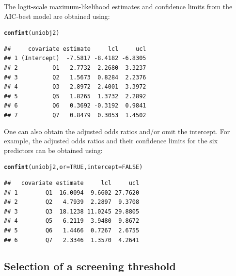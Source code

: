 \documentclass[11pt]{report}\usepackage[]{graphicx}\usepackage[]{xcolor}
\makeatletter
\newcommand{\hlnum}[1]{\textcolor[rgb]{0.686,0.059,0.569}{#1}}%
\newcommand{\hlstd}[1]{\textcolor[rgb]{0.345,0.345,0.345}{#1}}%
\newcommand{\hlkwc}[1]{\textcolor[rgb]{0.333,0.667,0.333}{#1}}%
\newcommand{\hlkwd}[1]{\textcolor[rgb]{0.737,0.353,0.396}{\textbf{#1}}}%
\newenvironment{kframe}{%
 \def\at@end@of@kframe{}%
 \ifinner\ifhmode%
  \def\at@end@of@kframe{\end{minipage}}%
  \begin{minipage}{\columnwidth}%
 \fi\fi%
 \def\FrameCommand##1{\hskip\@totalleftmargin \hskip-\fboxsep
 \colorbox{shadecolor}{##1}\hskip-\fboxsep
     \hskip-\linewidth \hskip-\@totalleftmargin \hskip\columnwidth}%
 \MakeFramed {\advance\hsize-\width
   \@totalleftmargin\z@ \linewidth\hsize
   \@setminipage}}%
 {\par\unskip\endMakeFramed%
 \at@end@of@kframe}
\newenvironment{knitrout}{}{} %
\makeatother
\begin{document}
The logit-scale maximum-likelihood estimates and confidence limits
from the AIC-best model are obtained using:
\begin{knitrout}
\color{fgcolor}\begin{kframe}
\begin{alltt}
\hlkwd{confint}\hlstd{(uniobj2)}
\end{alltt}


{\ttfamily\noindent\itshape\color{messagecolor}{\#\# Waiting for profiling to be done...}}\begin{verbatim}
##     covariate estimate     lcl     ucl
## 1 (Intercept)  -7.5817 -8.4182 -6.8305
## 2          Q1   2.7732  2.2680  3.3237
## 3          Q2   1.5673  0.8284  2.2376
## 4          Q3   2.8972  2.4001  3.3972
## 5          Q5   1.8265  1.3732  2.2892
## 6          Q6   0.3692 -0.3192  0.9841
## 7          Q7   0.8479  0.3053  1.4502
\end{verbatim}
\end{kframe}
\end{knitrout}
One can also obtain the adjusted odds ratios and/or omit the
intercept.  For example, the adjusted odds ratios and their confidence
limits for the six
predictors can be obtained using:
\begin{knitrout}
\color{fgcolor}\begin{kframe}
\begin{alltt}
\hlkwd{confint}\hlstd{(uniobj2,} \hlkwc{or} \hlstd{=} \hlnum{TRUE}\hlstd{,} \hlkwc{intercept} \hlstd{=} \hlnum{FALSE}\hlstd{)}
\end{alltt}


{\ttfamily\noindent\itshape\color{messagecolor}{\#\# Waiting for profiling to be done...}}\begin{verbatim}
##   covariate estimate     lcl     ucl
## 1        Q1  16.0094  9.6602 27.7620
## 2        Q2   4.7939  2.2897  9.3708
## 3        Q3  18.1238 11.0245 29.8805
## 4        Q5   6.2119  3.9480  9.8672
## 5        Q6   1.4466  0.7267  2.6755
## 6        Q7   2.3346  1.3570  4.2641
\end{verbatim}
\end{kframe}
\end{knitrout}

\subsection*{Selection of a screening threshold}
\end{document}

